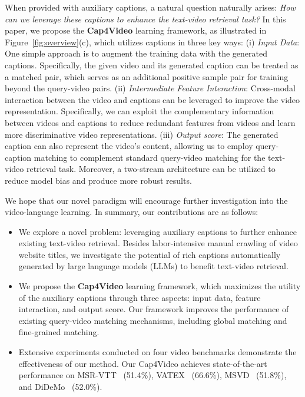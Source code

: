 \documentclass[10pt,twocolumn,letterpaper]{article}
\begin{document}
When provided with auxiliary captions, a natural question naturally arises: \emph{
How can we leverage these captions to enhance the text-video retrieval task?} In this paper, we propose the \textbf{Cap4Video} learning framework, as illustrated in Figure~\ref{fig:overview}(c), which utilizes captions in three key ways:
(i) \emph{Input Data}: One simple approach is to augment the training data with the generated captions. Specifically, the given video and its generated caption can be treated as a matched pair, which serves as an additional positive sample pair for training beyond the query-video pairs.
(ii) \emph{Intermediate Feature Interaction}: Cross-modal interaction between the video and captions can be leveraged to improve the video representation. Specifically, we can exploit the complementary information between videos and captions to reduce redundant features from videos and learn more discriminative video representations.
(iii) \emph{Output score}: The generated caption can also represent the video's content, allowing us to employ query-caption matching to complement standard query-video matching for the text-video retrieval task. Moreover, a two-stream architecture can be utilized to reduce model bias and produce more robust results.


We hope that our novel paradigm will encourage further investigation into the video-language learning.
In summary, our contributions are as follows:
\begin{itemize}
    \item We explore a novel problem: leveraging auxiliary captions to further enhance existing text-video retrieval. Besides labor-intensive manual crawling of video website titles, we investigate the potential of rich captions automatically generated by large language models (LLMs) to benefit text-video retrieval.
\item We propose the \textbf{Cap4Video} learning framework, which maximizes the utility of the auxiliary captions through three aspects: input data, feature interaction, and output score. Our framework improves the performance of existing query-video matching mechanisms, including global matching and fine-grained matching.
    \item Extensive experiments conducted on four video benchmarks demonstrate the effectiveness of our method. Our Cap4Video achieves state-of-the-art performance on MSR-VTT~\cite{xu2016msrvtt} (51.4\%), VATEX~\cite{wang2019vatex} (66.6\%), MSVD~\cite{wu2017msvd} (51.8\%), and DiDeMo~\cite{anne2017didemo} (52.0\%).
\end{itemize} 
\end{document}

